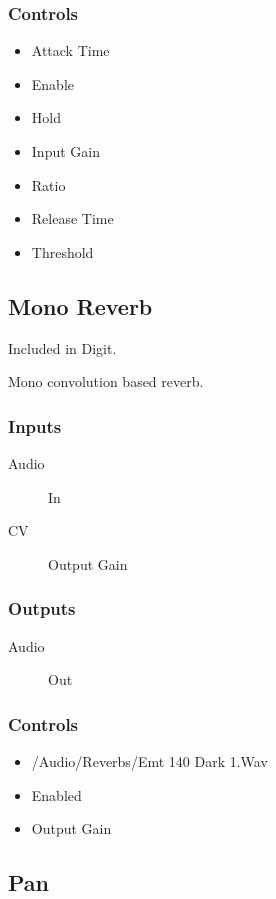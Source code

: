 \subsubsection{Controls}
\begin{itemize}
\item Attack Time
\item Enable
\item Hold
\item Input Gain
\item Ratio
\item Release Time
\item Threshold
\end{itemize}

\subsection{Mono Reverb}

Included in Digit.

Mono convolution based reverb.



\subsubsection{Inputs}
\begin{description}
\item [Audio] In
\item [CV] Output Gain
\end{description}

\subsubsection{Outputs}
\begin{description}
\item [Audio] Out
\end{description}

\subsubsection{Controls}
\begin{itemize}
\item /Audio/Reverbs/Emt 140 Dark 1.Wav
\item Enabled
\item Output Gain
\end{itemize}

\subsection{Pan}

